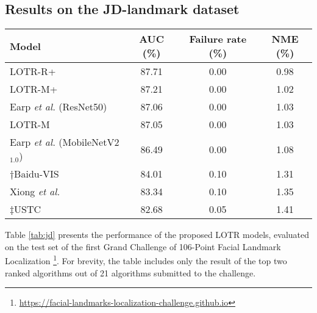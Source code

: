 \documentclass[journal]{IEEEtran}
\begin{document}
\subsection{Results on the JD-landmark dataset}\label{subsubsec:jd}

\begin{table*}
\caption{The evaluation results for different LOTR models on the JD-landmark test set; $\dagger$ and $\ddagger$ denote the first and second place entries.}
\centering
\begin{tabular}{lccc}
\hline
Model              & AUC (\%) & Failure rate (\%) & NME (\%) \\

\hline
LOTR-R+            & 87.71 & 0.00 & 0.98 \\
LOTR-M+            & 87.21 & 0.00 & 1.02 \\
Earp \textit{et al.} (ResNet50) \cite{earp2021sub}         & 87.06 & 0.00 & 1.03 \\
LOTR-M             & 87.05 & 0.00 &  1.03\\   Earp \textit{et al.} (MobileNetV2$_{1.0}$) \cite{earp2021sub}    & 86.49 & 0.00 & 1.08 \\
$\dagger$Baidu-VIS & 84.01 & 0.10 & 1.31 \\
Xiong \textit{et al.} \cite{xiong2020}   & 83.34 & 0.10 & 1.35 \\
$\ddagger$USTC     & 82.68 & 0.05 & 1.41 \\
\hline
\end{tabular}
\par
\label{tab:jd}
\end{table*}    


Table \ref{tab:jd} presents the performance of the proposed LOTR models, evaluated on the test set of the first Grand Challenge of 106-Point Facial Landmark Localization
\footnote{\label{footnote:jd1}\href{https://facial-landmarks-localization-challenge.github.io}{https://facial-landmarks-localization-challenge.github.io}}. 
For brevity, the table includes only the result of the top two ranked algorithms out of 21 algorithms submitted to the challenge.
\end{document}
